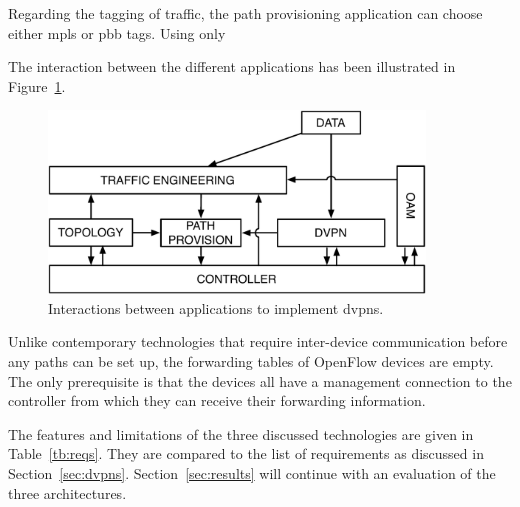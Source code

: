 Regarding the tagging of traffic, the path provisioning application can choose either \ac{mpls} or \ac{pbb} tags. Using only 

The interaction between the different applications has been illustrated in Figure~\ref{fig:dvpn-apps}.

\begin{figure}[h]
	\centering
	\includegraphics[width=10cm]{./includes/dvpn-apps.pdf}
	\caption{Interactions between applications to implement \acp{dvpn}.}
	\label{fig:dvpn-apps}
\end{figure}

Unlike contemporary technologies that require inter-device communication before any paths can be set up, the forwarding tables of OpenFlow devices are empty. The only prerequisite is that the devices all have a management connection to the controller from which they can receive their forwarding information.




\HRule

The features and limitations of the three discussed technologies are given in Table~\ref{tb:reqs}. They are compared to the list of requirements as discussed in Section~\ref{sec:dvpns}. Section~\ref{sec:results} will continue with an evaluation of the three architectures.

